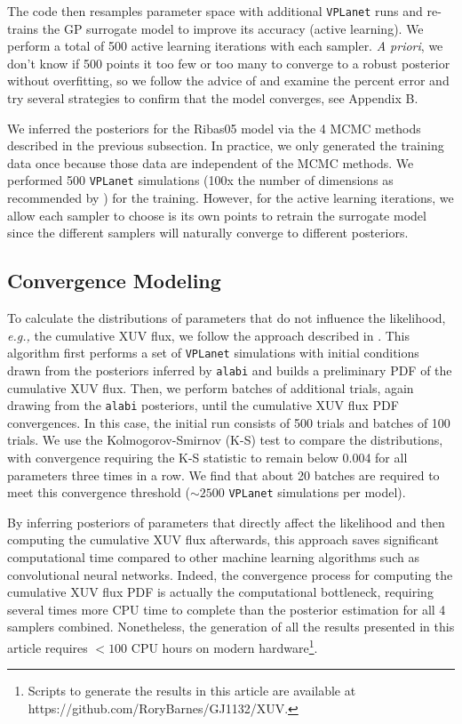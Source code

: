 \documentclass[preprint]{aastex631}
\def\eg{{\it e.g., }}
\def\vplanet{\texttt{\footnotesize{VPLanet}}\xspace}
\def\alabi{\texttt{\footnotesize{alabi}}\xspace}
\begin{document}
The code then resamples parameter space with additional \vplanet runs and re-trains the GP surrogate model to improve its accuracy (active learning). We perform a total of 500 active learning iterations with each sampler. {\it A priori}, we don't know if 500 points it too few or too many to converge to a robust posterior without overfitting, so we follow the advice of \citet{BirkyBarnes25} and examine the percent error and try several strategies to confirm that the model converges, see Appendix B.

We inferred the posteriors for the Ribas05 model via the 4 MCMC methods described in the previous subsection. In practice, we only generated the training data once because those data are independent of the MCMC methods. We performed 500 \vplanet simulations (100x the number of dimensions as recommended by \citep{BirkyBarnes25}) for the training. However, for the active learning iterations, we allow each sampler to choose is its own points to retrain the surrogate model since the different samplers will naturally converge to different posteriors.

\subsection{Convergence Modeling\label{sec:vconverge}}

To calculate the distributions of parameters that do not influence the likelihood, \eg the cumulative XUV flux, we follow the approach described in \citet{Gialluca24}. This algorithm first performs a set of \vplanet simulations with initial conditions drawn from the posteriors inferred by \alabi and builds a preliminary PDF of the cumulative XUV flux. Then, we perform batches of additional trials, again drawing from the \alabi posteriors, until the cumulative XUV flux PDF convergences. In this case, the initial run consists of 500 trials and batches of 100 trials. We use the Kolmogorov-Smirnov (K-S) test to compare the distributions, with convergence requiring the K-S statistic to remain below 0.004 for all parameters three times in a row. We find that about 20 batches are required to meet this convergence threshold ($\sim2500$ \vplanet simulations per model).

By inferring posteriors of parameters that directly affect the likelihood and then computing the cumulative XUV flux afterwards, this approach saves significant computational time compared to other machine learning algorithms such as convolutional neural networks. Indeed, the convergence process for computing the cumulative XUV flux PDF is actually the computational bottleneck, requiring several times more CPU time to complete than the posterior estimation for all 4 samplers combined. Nonetheless, the  generation of all the results presented in this article requires $<100$ CPU hours on modern hardware\footnote{Scripts to generate the results in this article are available at https://github.com/RoryBarnes/GJ1132/XUV.}.
\end{document}
